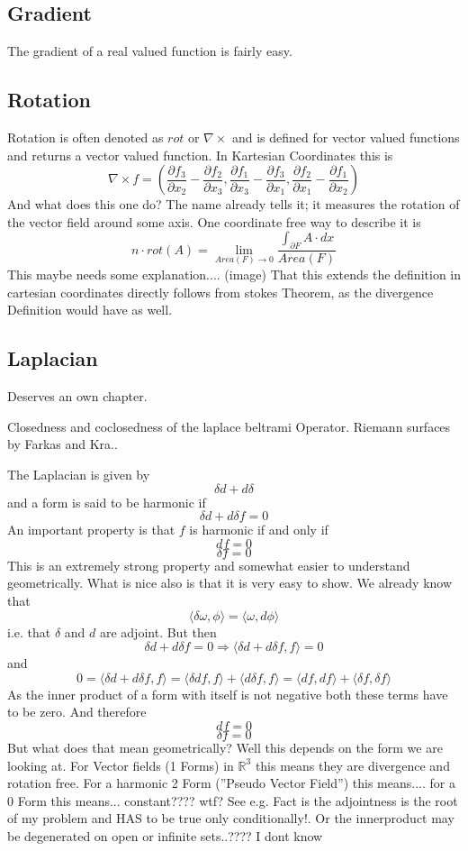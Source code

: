 \subsection{Gradient}
The gradient of a real valued function is fairly easy.

\subsection{Rotation}
Rotation is often denoted as $rot$ or $\nabla \times$ and is defined for vector valued functions and returns a vector valued function.  In Kartesian Coordinates this is
\[\nabla \times f = \left( \frac{ \partial f_3}{\partial x_2}- \frac{ \partial f_2}{\partial x_3}, \frac{ \partial f_1}{\partial x_3}- \frac{ \partial f_3}{\partial x_1}, \frac{ \partial f_2}{\partial x_1}- \frac{ \partial f_1}{\partial x_2}\right)\]
And what does this one do? The name already tells it; it measures the rotation of the vector field around some axis. One coordinate free way to describe it is
\[n\cdot rot(A) = \lim_{Area(F)\rightarrow 0 } \frac{\int_{\partial F} A \cdot dx}{Area(F)} \]
This maybe needs some explanation.... (image) That this extends the definition in cartesian coordinates directly follows from stokes Theorem, as the divergence Definition would have as well.


\subsection{Laplacian}
Deserves an own chapter.

Closedness and coclosedness of the laplace beltrami Operator. Riemann surfaces by Farkas and Kra..

The Laplacian is given by
\[\delta d + d \delta\]
and a form is said to be harmonic if
\[\delta d + d \delta f = 0\]
An important property is that $f$ is harmonic if and only if
\[df = 0\]
\[\delta f = 0\]
This is an extremely strong property and somewhat easier to understand geometrically. What is nice also is that it is very easy to show. We already know that
\[\langle \delta \omega,\phi\rangle = \langle \omega, d\phi\rangle\]
i.e. that $\delta$ and $d$ are adjoint. But then
\[\delta d + d \delta f = 0 \Rightarrow \langle \delta d + d \delta f, f\rangle = 0\]
and
\[0 = \langle \delta d + d \delta f, f\rangle = \langle \delta d f, f\rangle  + \langle d \delta f, f\rangle  = \langle d f, d f\rangle +\langle \delta f, \delta f\rangle\]
As the inner product of a form with itself is not negative both these terms have to be zero. And therefore
\[df = 0\]
\[\delta f = 0\]
But what does that mean geometrically? Well this depends on the form we are looking at. For Vector fields (1 Forms) in $\mathbb R^3$ this means they are divergence and rotation free. For a harmonic 2 Form (''Pseudo Vector Field'') this means.... for a 0 Form this means... constant???? wtf?
See e.g. %
Fact is the adjointness is the root of my problem and HAS to be true only conditionally!. Or the innerproduct may be degenerated on open or infinite sets..???? I dont know

